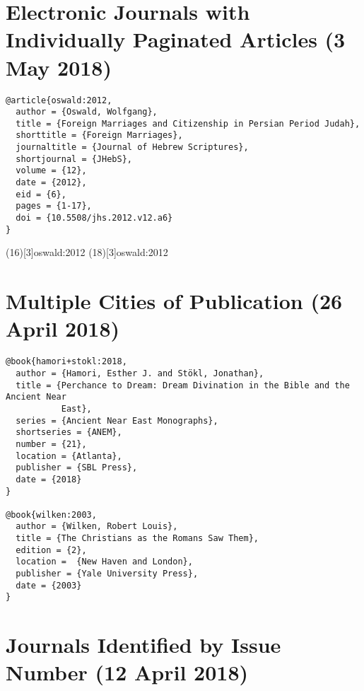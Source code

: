 \documentclass[a4paper]{article}
\begin{document}
\section{Electronic Journals with Individually Paginated Articles (3 May 2018)}

\begin{verbatim}
@article{oswald:2012,
  author = {Oswald, Wolfgang},
  title = {Foreign Marriages and Citizenship in Persian Period Judah},
  shorttitle = {Foreign Marriages},
  journaltitle = {Journal of Hebrew Scriptures},
  shortjournal = {JHebS},
  volume = {12},
  date = {2012},
  eid = {6},
  pages = {1-17},
  doi = {10.5508/jhs.2012.v12.a6}
}
\end{verbatim}

\examplecite(16)[3]{oswald:2012}
\examplecite(18)[3]{oswald:2012}
\exampleabbreviations
\examplebibliography
{}

\section{Multiple Cities of Publication (26 April 2018)}

\begin{verbatim}
@book{hamori+stokl:2018,
  author = {Hamori, Esther J. and Stökl, Jonathan},
  title = {Perchance to Dream: Dream Divination in the Bible and the Ancient Near
           East},
  series = {Ancient Near East Monographs},
  shortseries = {ANEM},
  number = {21},
  location = {Atlanta},
  publisher = {SBL Press},
  date = {2018}
}

@book{wilken:2003,
  author = {Wilken, Robert Louis},
  title = {The Christians as the Romans Saw Them},
  edition = {2},
  location =  {New Haven and London},
  publisher = {Yale University Press},
  date = {2003}
}
\end{verbatim}

\begin{verbcite}
  \nocite{hamori+stokl:2018, wilken:2003}
\end{verbcite}
\exampleabbreviations
\examplebibliography
{}

\section{Journals Identified by Issue Number (12 April 2018)}
\end{document}
